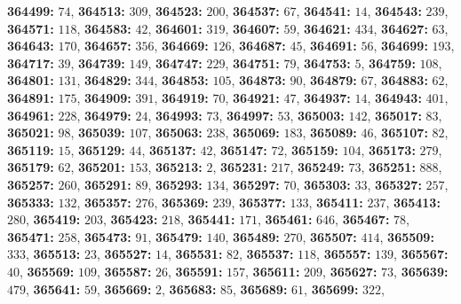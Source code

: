 \textsf{\bfseries 364499:} $74$, \textsf{\bfseries 364513:} $309$, \textsf{\bfseries 364523:} $200$, \textsf{\bfseries 364537:} $67$, \textsf{\bfseries 364541:} $14$, \textsf{\bfseries 364543:} $239$, \textsf{\bfseries 364571:} $118$, \textsf{\bfseries 364583:} $42$, \textsf{\bfseries 364601:} $319$, \textsf{\bfseries 364607:} $59$, \textsf{\bfseries 364621:} $434$, \textsf{\bfseries 364627:} $63$, \textsf{\bfseries 364643:} $170$, \textsf{\bfseries 364657:} $356$, \textsf{\bfseries 364669:} $126$, \textsf{\bfseries 364687:} $45$, \textsf{\bfseries 364691:} $56$, \textsf{\bfseries 364699:} $193$, \textsf{\bfseries 364717:} $39$, \textsf{\bfseries 364739:} $149$, \textsf{\bfseries 364747:} $229$, \textsf{\bfseries 364751:} $79$, \textsf{\bfseries 364753:} $5$, \textsf{\bfseries 364759:} $108$, \textsf{\bfseries 364801:} $131$, \textsf{\bfseries 364829:} $344$, \textsf{\bfseries 364853:} $105$, \textsf{\bfseries 364873:} $90$, \textsf{\bfseries 364879:} $67$, \textsf{\bfseries 364883:} $62$, \textsf{\bfseries 364891:} $175$, \textsf{\bfseries 364909:} $391$, \textsf{\bfseries 364919:} $70$, \textsf{\bfseries 364921:} $47$, \textsf{\bfseries 364937:} $14$, \textsf{\bfseries 364943:} $401$, \textsf{\bfseries 364961:} $228$, \textsf{\bfseries 364979:} $24$, \textsf{\bfseries 364993:} $73$, \textsf{\bfseries 364997:} $53$, \textsf{\bfseries 365003:} $142$, \textsf{\bfseries 365017:} $83$, \textsf{\bfseries 365021:} $98$, \textsf{\bfseries 365039:} $107$, \textsf{\bfseries 365063:} $238$, \textsf{\bfseries 365069:} $183$, \textsf{\bfseries 365089:} $46$, \textsf{\bfseries 365107:} $82$, \textsf{\bfseries 365119:} $15$, \textsf{\bfseries 365129:} $44$, \textsf{\bfseries 365137:} $42$, \textsf{\bfseries 365147:} $72$, \textsf{\bfseries 365159:} $104$, \textsf{\bfseries 365173:} $279$, \textsf{\bfseries 365179:} $62$, \textsf{\bfseries 365201:} $153$, \textsf{\bfseries 365213:} $2$, \textsf{\bfseries 365231:} $217$, \textsf{\bfseries 365249:} $73$, \textsf{\bfseries 365251:} $888$, \textsf{\bfseries 365257:} $260$, \textsf{\bfseries 365291:} $89$, \textsf{\bfseries 365293:} $134$, \textsf{\bfseries 365297:} $70$, \textsf{\bfseries 365303:} $33$, \textsf{\bfseries 365327:} $257$, \textsf{\bfseries 365333:} $132$, \textsf{\bfseries 365357:} $276$, \textsf{\bfseries 365369:} $239$, \textsf{\bfseries 365377:} $133$, \textsf{\bfseries 365411:} $237$, \textsf{\bfseries 365413:} $280$, \textsf{\bfseries 365419:} $203$, \textsf{\bfseries 365423:} $218$, \textsf{\bfseries 365441:} $171$, \textsf{\bfseries 365461:} $646$, \textsf{\bfseries 365467:} $78$, \textsf{\bfseries 365471:} $258$, \textsf{\bfseries 365473:} $91$, \textsf{\bfseries 365479:} $140$, \textsf{\bfseries 365489:} $270$, \textsf{\bfseries 365507:} $414$, \textsf{\bfseries 365509:} $333$, \textsf{\bfseries 365513:} $23$, \textsf{\bfseries 365527:} $14$, \textsf{\bfseries 365531:} $82$, \textsf{\bfseries 365537:} $118$, \textsf{\bfseries 365557:} $139$, \textsf{\bfseries 365567:} $40$, \textsf{\bfseries 365569:} $109$, \textsf{\bfseries 365587:} $26$, \textsf{\bfseries 365591:} $157$, \textsf{\bfseries 365611:} $209$, \textsf{\bfseries 365627:} $73$, \textsf{\bfseries 365639:} $479$, \textsf{\bfseries 365641:} $59$, \textsf{\bfseries 365669:} $2$, \textsf{\bfseries 365683:} $85$, \textsf{\bfseries 365689:} $61$, \textsf{\bfseries 365699:} $322$, 
